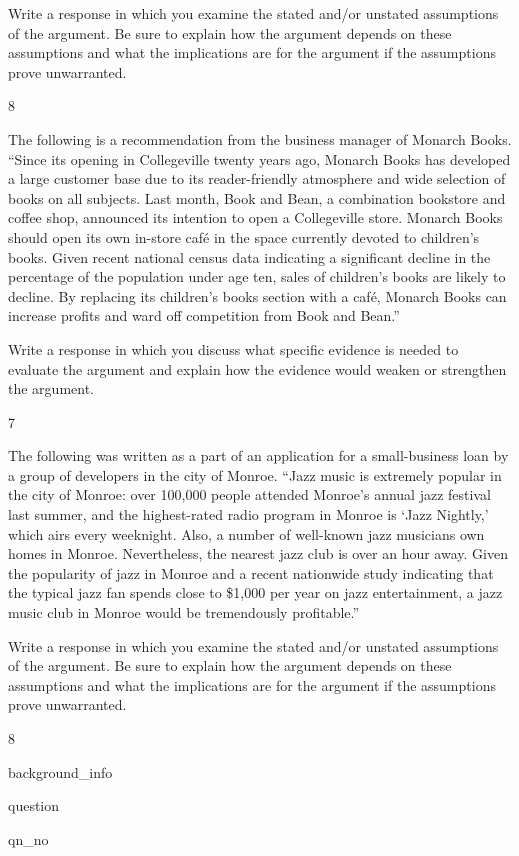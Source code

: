 \documentclass[]{article}
\begin{document}
Write a response in which you examine the stated and/or unstated
assumptions of the argument. Be sure to explain how the argument depends
on these assumptions and what the implications are for the argument if
the assumptions prove unwarranted.

8

The following is a recommendation from the business manager of Monarch
Books. ``Since its opening in Collegeville twenty years ago, Monarch
Books has developed a large customer base due to its reader-friendly
atmosphere and wide selection of books on all subjects. Last month, Book
and Bean, a combination bookstore and coffee shop, announced its
intention to open a Collegeville store. Monarch Books should open its
own in-store café in the space currently devoted to children's books.
Given recent national census data indicating a significant decline in
the percentage of the population under age ten, sales of children's
books are likely to decline. By replacing its children's books section
with a café, Monarch Books can increase profits and ward off competition
from Book and Bean.''

Write a response in which you discuss what specific evidence is needed
to evaluate the argument and explain how the evidence would weaken or
strengthen the argument.

7

The following was written as a part of an application for a
small-business loan by a group of developers in the city of Monroe.
``Jazz music is extremely popular in the city of Monroe: over 100,000
people attended Monroe's annual jazz festival last summer, and the
highest-rated radio program in Monroe is `Jazz Nightly,' which airs
every weeknight. Also, a number of well-known jazz musicians own homes
in Monroe. Nevertheless, the nearest jazz club is over an hour away.
Given the popularity of jazz in Monroe and a recent nationwide study
indicating that the typical jazz fan spends close to \$1,000 per year on
jazz entertainment, a jazz music club in Monroe would be tremendously
profitable.''

Write a response in which you examine the stated and/or unstated
assumptions of the argument. Be sure to explain how the argument depends
on these assumptions and what the implications are for the argument if
the assumptions prove unwarranted.

8

background\_info

question

qn\_no
\end{document}
